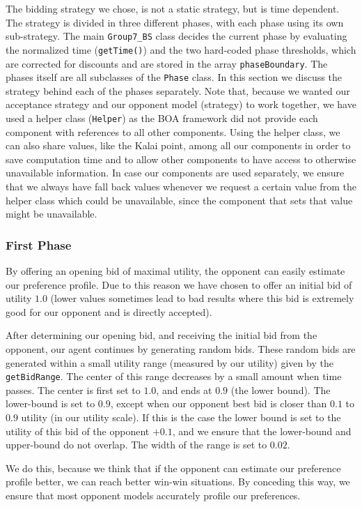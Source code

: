The bidding strategy we chose, is not a static strategy, but is time dependent. The strategy is divided in three different phases, with each phase using its own sub-strategy. The main \texttt{Group7\_BS} class decides the current phase by evaluating the normalized time (\texttt{getTime()}) and the two hard-coded phase thresholds, which are corrected for discounts and are stored in the array \texttt{phaseBoundary}. 
The phases itself are all subclasses of the \verb-Phase- class. In this section we discuss the strategy behind each of the phases separately. Note that, because we wanted our acceptance strategy and our opponent model (strategy) to 
work together, we have used a helper class (\verb-Helper-) as the BOA framework did not provide each component with references to all other components. Using the helper class, we can also share values, like the Kalai point, among all our components in order to save computation time and to allow other components to have access to otherwise unavailable information. In case our components are used separately, we ensure that we always have fall back values whenever we request a certain value from the helper class which could be unavailable, since the component that sets that value might be unavailable.

\subsubsection{First Phase}
By offering an opening bid of maximal utility, the opponent can easily estimate our preference profile. Due to this reason we have chosen to offer an initial bid of utility $1.0$ (lower values sometimes lead to bad results where this bid is extremely good for our opponent and is directly accepted).

After determining our opening bid, and receiving the initial bid from the opponent, our agent continues by generating random bids. These random bids are generated within a small utility range (measured by our utility) given by the \verb-getBidRange-. The center of this range decreases by a small amount when time passes.
The center is first set to $1.0$, and ends at $0.9$ (the lower bound). The lower-bound is set to $0.9$, except when our opponent best bid is closer than $0.1$ to $0.9$ utility (in our utility scale). If this is the case the lower bound is set to the utility of this bid of the opponent $+0.1$, and we ensure that the lower-bound and upper-bound do not overlap. The width of the range is set to  $0.02$. 

We do this, because we think that if the opponent can estimate our preference profile better,
we can reach better win-win situations. By conceding this way, we ensure that most opponent 
models accurately profile our preferences.

